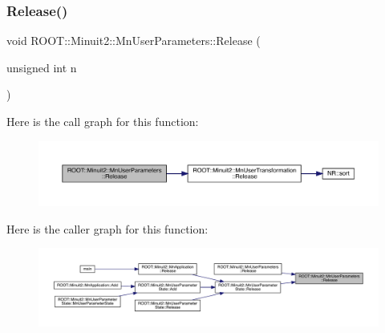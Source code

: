 \mbox{\label{classROOT_1_1Minuit2_1_1MnUserParameters_a7bd8fe4d8f50de145f3f3abc6ec4fae4}} 
\subsubsection{\texorpdfstring{Release()}{Release()}\hspace{0.1cm}{\footnotesize\ttfamily [3/6]}}
{\footnotesize\ttfamily void R\+O\+O\+T\+::\+Minuit2\+::\+Mn\+User\+Parameters\+::\+Release (\begin{DoxyParamCaption}\item[{unsigned int}]{n }\end{DoxyParamCaption})}

Here is the call graph for this function\+:
\nopagebreak
\begin{figure}[H]
\begin{center}
\leavevmode
\includegraphics[width=350pt]{d6/d10/classROOT_1_1Minuit2_1_1MnUserParameters_a7bd8fe4d8f50de145f3f3abc6ec4fae4_cgraph}
\end{center}
\end{figure}
Here is the caller graph for this function\+:
\nopagebreak
\begin{figure}[H]
\begin{center}
\leavevmode
\includegraphics[width=350pt]{d6/d10/classROOT_1_1Minuit2_1_1MnUserParameters_a7bd8fe4d8f50de145f3f3abc6ec4fae4_icgraph}
\end{center}
\end{figure}
\mbox{\label{classROOT_1_1Minuit2_1_1MnUserParameters_ac178a853a9641a88a9a1412224e6e105}} 
